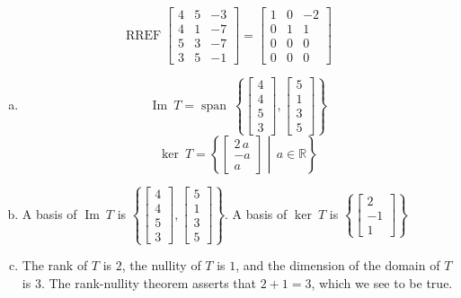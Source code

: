 \begin{exerciseAnswer} 


\[\operatorname{RREF} \left[\begin{array}{ccc}
4 & 5 & -3 \\
4 & 1 & -7 \\
5 & 3 & -7 \\
3 & 5 & -1
\end{array}\right] = \left[\begin{array}{ccc}
1 & 0 & -2 \\
0 & 1 & 1 \\
0 & 0 & 0 \\
0 & 0 & 0
\end{array}\right] \]


\begin{enumerate}[(a)]
\item \[\operatorname{Im}\ T = \operatorname{span}\  \left\{ \left[\begin{array}{c}
4 \\
4 \\
5 \\
3
\end{array}\right] , \left[\begin{array}{c}
5 \\
1 \\
3 \\
5
\end{array}\right] \right\} \]\[\operatorname{ker}\ T =  \left\{ \left[\begin{array}{c}
2 \, a \\
-a \\
a
\end{array}\right] \middle|\,a\in\mathbb{R}\right\} \]
\item  A basis of \(\operatorname{Im}\ T\) is \( \left\{ \left[\begin{array}{c}
4 \\
4 \\
5 \\
3
\end{array}\right] , \left[\begin{array}{c}
5 \\
1 \\
3 \\
5
\end{array}\right] \right\} \). A basis of \(\operatorname{ker}\ T\) is \( \left\{ \left[\begin{array}{c}
2 \\
-1 \\
1
\end{array}\right] \right\} \)
\item  The rank of \(T\) is \( 2 \), the nullity of \(T\) is \( 1 \), and the dimension of the domain of \(T\) is \( 3 \). The rank-nullity theorem asserts that \( 2 + 1 = 3 \), which we see to be true. 
\end{enumerate}
    
\end{exerciseAnswer}
    
